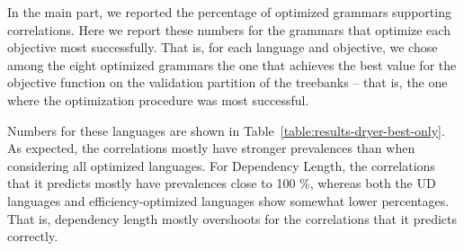 \documentclass[12pt]{article}
\begin{document}
In the main part, we reported the percentage of optimized grammars supporting correlations.
Here we report these numbers for the grammars that optimize each objective most successfully.
That is, for each language and objective, we chose among the eight optimized grammars the one that achieves the best value for the objective function on the validation partition of the treebanks -- that is, the one where the optimization procedure was most successful.

Numbers for these languages are shown in Table~\ref{table:results-dryer-best-only}.
As expected, the correlations mostly have stronger prevalences than when considering all optimized languages.
For Dependency Length, the correlations that it predicts mostly have prevalences close to 100 \%, whereas both the UD languages and efficiency-optimized languages show somewhat lower percentages.
That is, dependency length mostly overshoots for the correlations that it predicts correctly.
\end{document}
